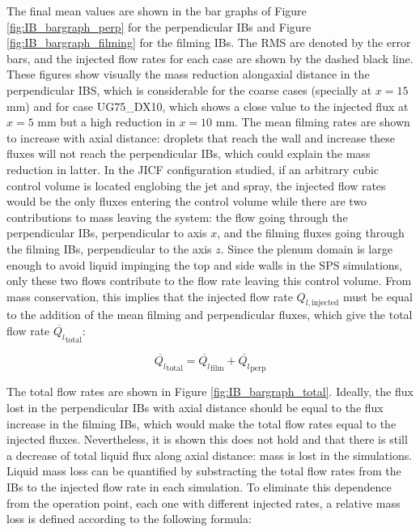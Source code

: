 \clearpage

The final mean values are shown in the bar graphs of Figure \ref{fig:IB_bargraph_perp} for the perpendicular IBs and Figure  \ref{fig:IB_bargraph_filming} for the filming IBs. The RMS are denoted by the error bars, and the injected flow rates for each case are shown by the dashed black line. These figures show visually the mass reduction alongaxial distance in the perpendicular IBS, which is considerable for the coarse cases (specially at $x = 15$ mm) and for case UG75\_DX10, which shows a close value to the injected flux at $x = 5$ mm but a high reduction in $x = 10$ mm. The mean filming rates are shown to increase with axial distance: droplets that reach the wall and increase these fluxes will not reach the perpendicular IBs, which could explain the mass reduction in latter. In the JICF configuration studied, if an arbitrary cubic control volume is located englobing the jet and spray, the injected flow rates would be the only fluxes entering the control volume while there are two contributions to mass leaving the system: the flow going through the perpendicular IBs, perpendicular to axis $x$, and the filming fluxes going through the filming IBs, perpendicular to the axis $z$. Since the plenum domain is large enough to avoid liquid impinging the top and side walls in the SPS simulations, only these two flows contribute to the flow rate leaving this control volume. From mass conservation, this implies that the injected flow rate $Q_{l,\mathrm{injected}}$ must be equal to the addition of the mean filming and perpendicular fluxes, which give the total flow rate $\overline{Q_l}_\mathrm{total}$:

\begin{equation}
\overline{Q_l}_{\mathrm{total}} = \overline{Q_l}_{\mathrm{film}} + \overline{Q_l}_{\mathrm{perp}}
\end{equation}

The total flow rates are shown in Figure \ref{fig:IB_bargraph_total}. Ideally, the flux lost in the perpendicular IBs with axial distance should be equal to the flux increase in the filming IBs, which would make the total flow rates equal to the injected fluxes. Nevertheless, it is shown this does not hold and that there is still a decrease of total liquid flux along axial distance: mass is lost in the simulations. Liquid mass loss can be quantified by substracting the total flow rates from the IBs to the injected flow rate in each simulation. To eliminate this dependence from the operation point, each one with different injected rates, a relative mass loss is defined according to the following formula:

